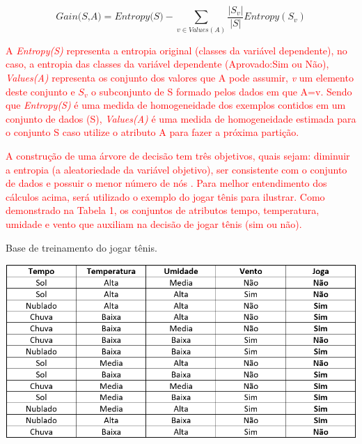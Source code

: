 \begin{equation}
    \label{eq:Ganho}
        {\textit{Gain(S,A)}={\textit{Entropy(S)} -  \sum_{v \in Values(A)} \frac{|S_v|}{|S|} Entropy(S_v) } }
\end{equation}

\par
\textcolor{red}{A \textit{Entropy(S)} representa a entropia original (classes da variável dependente), no caso, a entropia das classes da variável dependente (Aprovado:Sim ou Não), \textit{Values(A)} representa os conjunto dos valores que A pode assumir, \textit{v} um elemento deste conjunto e $S_v$ o subconjunto de S formado pelos dados em que A=v. Sendo que \textit{Entropy(S)} é uma medida de homogeneidade  dos exemplos contidos em um conjunto de dados (S), \textit{Values(A)} é uma medida de homogeneidade estimada para o
conjunto S caso utilize o atributo A para fazer a próxima partição.}

\par
\textcolor{red}{A construção de uma árvore de decisão tem três objetivos, quais sejam: diminuir a entropia (a aleatoriedade da variável objetivo), ser consistente com o conjunto de dados e possuir o menor número de nós \cite{Steiner2004}. Para melhor entendimento dos cálculos acima, será utilizado o exemplo do jogar tênis para ilustrar. Como demonstrado na Tabela 1, os conjuntos de atributos tempo, temperatura, umidade e vento que auxiliam na decisão de jogar tênis (sim ou não).}

\par
\begin{table}[!htp]
	\begin{center}
    \caption{\label{fig:waveform_fig} Base de treinamento do jogar tênis.}
	\includegraphics[scale=0.65]{Figuras/Jogar_tenis.png}
	\end{center}
\end{table}

